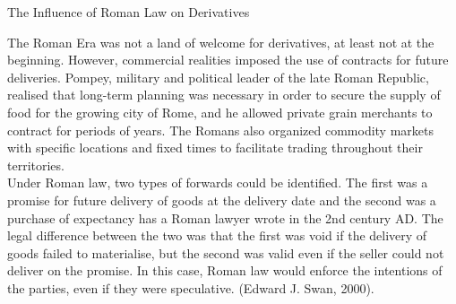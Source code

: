 \documentclass[unknownkeysallowed, compress]{beamer}
\theoremstyle{plain}
\begin{document}
\begin{frame}[allowframebreaks]{The Influence of Roman Law on Derivatives}
\noindent
\par The Roman Era was not a land of welcome for derivatives, at least not at the
beginning. However, commercial realities imposed the use of contracts for future
deliveries. Pompey, military and political leader of the late Roman Republic, realised that
long-term planning was necessary in order to secure the supply of food for the growing
city of Rome, and he allowed private grain merchants to contract for periods of years.
The Romans also organized commodity markets with specific locations and fixed times to
facilitate trading throughout their territories.\\
Under Roman law, two types of forwards could be identified. The first was a promise for
future delivery of goods at the delivery date and the second was a purchase of
expectancy has a Roman lawyer wrote in the 2nd century AD. The legal difference
between the two was that the first was void if the delivery of goods failed to materialise,
but the second was valid even if the seller could not deliver on the promise. In this case,
Roman law would enforce the intentions of the parties, even if they were speculative. (Edward J. Swan, 2000).

\end{frame}
\end{document}
